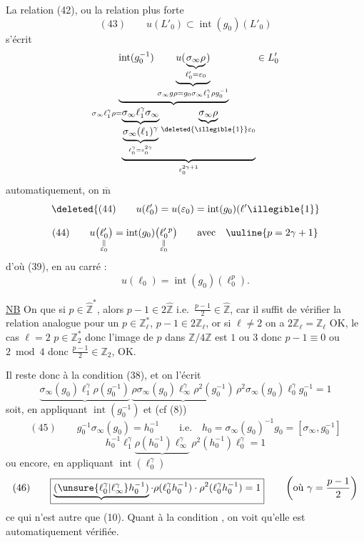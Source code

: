 La relation (42), ou la relation  plus forte
\[
(43)\qquad u(L'_0)\subset\operatorname{int}(g_0)(L'_0)
\]
s'écrit
\[
\underbrace{\operatorname{int}(g_0^{-1})\,
\underbrace{u(\underbrace{\sigma_\infty\rho}_{\ell'_0=\varepsilon_0})}_{
\sigma_\infty g\rho=g_0\sigma_\infty \ell_1^\gamma\rho g_0^{-1}}}_{
\sigma_\infty \ell_1^\gamma\rho
=\underbrace{\underbrace{\sigma_\infty \ell_1^\gamma\sigma_\infty}_{
 \underbrace{\sigma_\infty(\ell_1)^\gamma}_{\ell_0^\gamma=\varepsilon_0^{2\gamma}}}
\underbrace{\sigma_\infty\rho}_{\deleted{\illegible{1}}\varepsilon_0}}_{
\varepsilon_0^{2\gamma+1}}}
\in L'_0
\]
 automatiquement, on 
$\overline{\mathrm m}$
\[
\deleted{(44)\qquad u(\ell'_0)=u(\varepsilon_0)
=\operatorname{int}(g_0)(\ell'\illegible{1}}
\]


\[
(44)\qquad
u\bigl(\underset{\substack{\Vert\\ \varepsilon_0}}{\ell'_0}\bigr)
 = \operatorname{int}(g_0)\bigl(\underset{\substack{\Vert\\ \varepsilon_0}}{\ell'_0}{}^{p}\bigr)
\qquad \text{avec}\quad \uuline{p=2\gamma+1}
\]
d'où (39),  en  au carré :
\[
u(\ell_0)=\operatorname{int}(g_0)(\ell_0^p).
\]

\quad
\uline{NB} On  que si $p\in\widehat{\mathbb Z}^{*}$, alors
$p-1\in 2\widehat{\mathbb Z}$ i.e.\ $\frac{p-1}{2}\in\widehat{\mathbb Z}$,
car il suffit de vérifier la relation analogue pour un $p\in\mathbb Z_\ell^{*}$,
 $p-1\in 2\mathbb Z_\ell$, or si $\ell\ne2$ on a
$2\mathbb Z_\ell=\mathbb Z_\ell$ OK,  le cas $\ell=2$
$p\in\mathbb Z_2^{*}$ donc l'image de $p$ dans $\mathbb Z/4\mathbb Z$
est $1$ ou $3$ donc $p-1\equiv0$ ou $2\bmod4$
 donc $\frac{p-1}{2}\in\mathbb Z_2$, OK.

\par
Il reste donc à  la condition (38), et on l'écrit
\[
\underbrace{\sigma_\infty(g_0)\ell_1^\gamma\rho(g_0^{-1})}\,
\underbrace{\rho\sigma_\infty(g_0)\ell_\infty^\gamma\rho^2(g_0^{-1})}\,
\rho^2\sigma_\infty(g_0)\ell_0^\gamma g_0^{-1}=1
\]
soit, en appliquant $\operatorname{int}(g_0^{-1})$ et
(cf (8))
\[
(45)\qquad g_0^{-1}\sigma_\infty(g_0)=h_0^{-1}
\qquad\text{i.e.}\quad
h_0=\sigma_\infty(g_0)^{-1}g_0=[\sigma_\infty,g_0^{-1}]
\]
\[
h_0^{-1}\ell_1^\gamma\underbrace{\rho(h_0^{-1})\ell_\infty^\gamma}\,
\rho^2(h_0^{-1})\ell_0^\gamma=1
\]
ou encore, en appliquant $\operatorname{int}(\ell_0^\gamma)$
\[
(46)\qquad
\boxed{\underbrace{(\unsure{\ell_0^\gamma|\ell_\infty^\gamma}h_0^{-1})}\cdot
\rho(\ell_0^\gamma h_0^{-1})\cdot\rho^2(\ell_0^\gamma h_0^{-1})=1}
\qquad\left(\text{où }\gamma=\frac{p-1}{2}\right)
\]
ce qui n'est autre que (10). Quant à la condition ,
on voit qu'elle est  automatiquement vérifiée.

